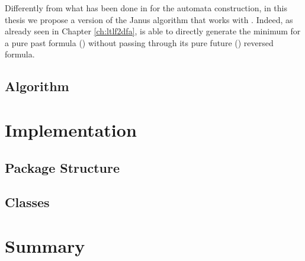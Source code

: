 Differently from what has been done in \citep{cecconi2018interestingness} for the automata construction, in this thesis we propose a version of the Janus algorithm that works with \LTLfToDFA. Indeed, as already seen in Chapter \ref{ch:ltlf2dfa}, \LTLfToDFA is able to directly generate the minimum \DFA for a pure past formula (\PLTL) without passing through its pure future (\LTLf) reversed formula.
\subsection{Algorithm}
\section{Implementation}\label{sec:janus-implementation}
\subsection{Package Structure}
\subsection{Classes}
\section{Summary}